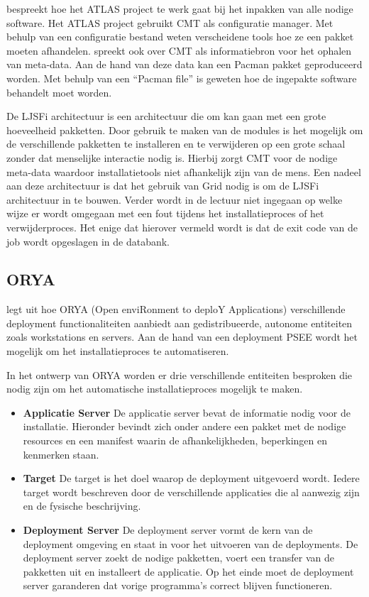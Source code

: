 \citet{Obreshkov2008244} bespreekt hoe het ATLAS project te werk gaat bij het inpakken van alle nodige software.
Het ATLAS project gebruikt CMT \citep{cmt} als configuratie manager.
Met behulp van een configuratie bestand weten verscheidene tools hoe ze een pakket moeten afhandelen.
\citet{packAtlas} spreekt ook over CMT als informatiebron voor het ophalen van meta-data.
Aan de hand van deze data kan een Pacman pakket geproduceerd worden.
Met behulp van een ``Pacman file'' is geweten hoe de ingepakte software behandelt moet worden.

De LJSFi architectuur is een architectuur die om kan gaan met een grote hoeveelheid pakketten.
Door gebruik te maken van de modules is het mogelijk om de verschillende pakketten te installeren en te verwijderen op een grote schaal zonder dat menselijke interactie nodig is.
Hierbij zorgt CMT voor de nodige meta-data waardoor installatietools niet afhankelijk zijn van de mens.
Een nadeel aan deze architectuur is dat het gebruik van Grid nodig is om de LJSFi architectuur in te bouwen.
Verder wordt in de lectuur niet ingegaan op welke wijze er wordt omgegaan met een fout tijdens het installatieproces of het verwijderproces.
Het enige dat hierover vermeld wordt is dat de exit code van de job wordt opgeslagen in de databank.

\subsection{ORYA}\label{sec:ORYA}
\citet{lestideau2003providing} legt uit hoe ORYA (Open enviRonment to deploY Applications) verschillende deployment functionaliteiten aanbiedt aan gedistribueerde, autonome entiteiten zoals workstations en servers.
Aan de hand van een deployment PSEE \citep{belkhatir2007adele} wordt het mogelijk om het installatieproces te automatiseren.

In het ontwerp van ORYA worden er drie verschillende entiteiten besproken die nodig zijn om het automatische installatieproces mogelijk te maken.
\begin{itemize}
\item \textbf{Applicatie Server} De applicatie server bevat de informatie nodig voor de installatie.
Hieronder bevindt zich onder andere een pakket met de nodige resources en een manifest waarin de afhankelijkheden, beperkingen en kenmerken staan.
\item \textbf{Target} De target is het doel waarop de deployment uitgevoerd wordt.
Iedere target wordt beschreven door de verschillende applicaties die al aanwezig zijn en de fysische beschrijving.
\item \textbf{Deployment Server} De deployment server vormt de kern van de deployment omgeving en staat in voor het uitvoeren van de deployments. 
De deployment server zoekt de nodige pakketten, voert een transfer van de pakketten uit en installeert de applicatie.
Op het einde moet de deployment server garanderen dat vorige programma's correct blijven functioneren.
\end{itemize}

